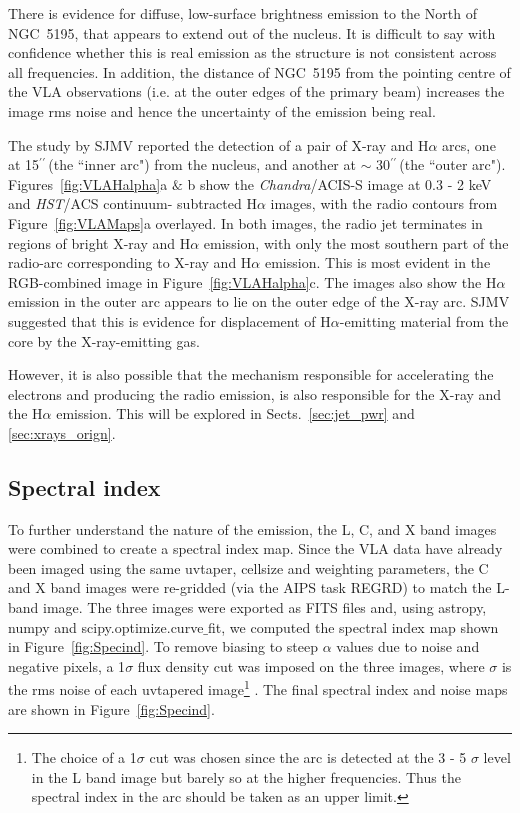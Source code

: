 \documentclass[fleqn,usenatbib]{mnras}
\def\fig{Figure}
\def\Fig{Figure}
\def\Figs{Figures}
\def\sects{Sects.}
\def\arcs{$^{\prime\prime}\,$}
\begin{document}

There is evidence for diffuse, low-surface brightness emission to the North of NGC~5195, that appears 
to extend out of the nucleus. It is difficult to say with confidence whether this is real emission as 
the structure is not consistent across all frequencies. In addition, the distance of NGC~5195 from the pointing centre of the VLA observations (i.e. at the outer edges of the primary beam) increases the image rms noise and hence the uncertainty of the emission being real.

The study by SJMV reported the detection of a pair of X-ray and H$\alpha$ arcs, one at 15\arcs (the ``inner arc") from the nucleus, and  another at $\sim$ 30\arcs (the ``outer arc"). \Figs~\ref{fig:VLAHalpha}a $\&$ b show the \textit{Chandra}/ACIS-S image at 0.3 - 2 keV and \textit{HST}/ACS continuum-
subtracted H$\alpha$ images, with the radio contours from \fig~\ref{fig:VLAMaps}a overlayed.
In both images, the radio jet terminates in regions of bright X-ray and H$\alpha$ emission, with only the 
most southern part of the radio-arc corresponding to X-ray and H$\alpha$ emission. This is most evident in 
the RGB-combined image in \Fig~\ref{fig:VLAHalpha}c. {The images also show the H$\alpha$ emission in the outer arc appears to lie on the outer edge of the X-ray arc. SJMV suggested that this is evidence for displacement of H$\alpha$-emitting material from the core by the X-ray-emitting gas}. 

{However, it is also possible that the mechanism responsible for accelerating the electrons and producing the 
radio emission, is also responsible for the X-ray and the H$\alpha$ emission. This will be explored in \sects~\ref{sec:jet_pwr} and \ref{sec:xrays_orign}.}


\subsection{Spectral index}

To further understand the nature of the emission, the L,  C, and X band images were combined to create a spectral index map. Since the VLA data have already been imaged using the same uvtaper, cellsize and weighting parameters, the C and X band images were re-gridded (via the AIPS task REGRD) to match the L-band image. The three images were 
exported as FITS files and, using astropy, numpy and scipy.optimize.curve$\_$fit, we computed the spectral index map shown in \fig~\ref{fig:Specind}. To remove biasing to steep $\alpha$ 
values due to noise and negative pixels, a 1$\sigma$ flux density cut was imposed on the three images, where $\sigma$ is the rms noise of each uvtapered image\footnote{The choice of a 1$
\sigma$ cut was chosen since the arc is detected at the 3 - 5 $\sigma$ level in the L band image but barely so at the higher frequencies. Thus the spectral index in the arc should be taken as an 
upper limit.} . The final spectral index and noise maps are shown in \fig~\ref{fig:Specind}. 
\end{document}
